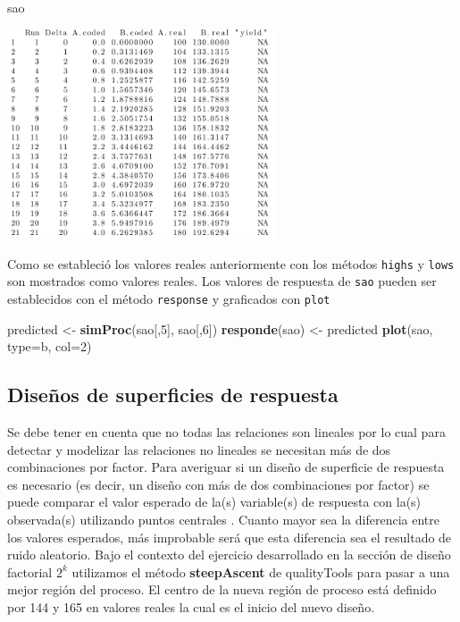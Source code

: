 \documentclass[
]{book}
\newenvironment{Shaded}{\begin{snugshade}}{\end{snugshade}}
\newcommand{\AttributeTok}[1]{\textcolor[rgb]{0.13,0.29,0.53}{#1}}
\newcommand{\DecValTok}[1]{\textcolor[rgb]{0.00,0.00,0.81}{#1}}
\newcommand{\FunctionTok}[1]{\textcolor[rgb]{0.13,0.29,0.53}{\textbf{#1}}}
\newcommand{\NormalTok}[1]{#1}
\newcommand{\OtherTok}[1]{\textcolor[rgb]{0.56,0.35,0.01}{#1}}
\newcommand{\StringTok}[1]{\textcolor[rgb]{0.31,0.60,0.02}{#1}}
\begin{document}
\begin{Shaded}
\begin{Highlighting}[]
\NormalTok{sao}
\end{Highlighting}
\end{Shaded}

\includegraphics[width=3.125in,height=\textheight]{graficos/renddfac2.png}

Como se estableció los valores reales anteriormente con los métodos \texttt{highs} y \texttt{lows} son mostrados como valores reales. Los valores de respuesta de \texttt{sao} pueden ser establecidos con el método \texttt{response} y graficados con \texttt{plot}

\begin{Shaded}
\begin{Highlighting}[]
\NormalTok{predicted }\OtherTok{\textless{}{-}} \FunctionTok{simProc}\NormalTok{(sao[,}\DecValTok{5}\NormalTok{], sao[,}\DecValTok{6}\NormalTok{])}
\FunctionTok{responde}\NormalTok{(sao) }\OtherTok{\textless{}{-}}\NormalTok{ predicted}
\FunctionTok{plot}\NormalTok{(sao, }\AttributeTok{type=}\StringTok{\textquotesingle{}b\textquotesingle{}}\NormalTok{, }\AttributeTok{col=}\DecValTok{2}\NormalTok{)}
\end{Highlighting}
\end{Shaded}

\hypertarget{diseuxf1os-de-superficies-de-respuesta}{%
\subsection{Diseños de superficies de respuesta}\label{diseuxf1os-de-superficies-de-respuesta}}

Se debe tener en cuenta que no todas las relaciones son lineales por lo cual para detectar y modelizar las relaciones no lineales se necesitan más de dos combinaciones por factor. Para averiguar si un diseño de superficie de respuesta es necesario (es decir, un diseño con más de dos combinaciones por factor) se puede
comparar el valor esperado de la(s) variable(s) de respuesta con la(s) observada(s) utilizando
puntos centrales . Cuanto mayor sea la diferencia entre los valores
esperados, más improbable será que esta diferencia sea el resultado de ruido aleatorio.
Bajo el contexto del ejercicio desarrollado en la sección de diseño factorial \(2^{k}\) utilizamos el método \textbf{steepAscent} de qualityTools para pasar a una mejor región del proceso. El centro de la
nueva región de proceso está definido por 144 y 165 en valores reales la cual es el inicio del nuevo diseño.
\end{document}
